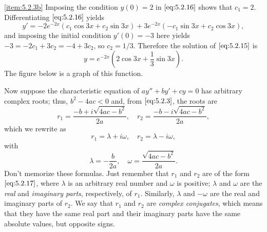 \documentclass{ximera}
\begin{document}
\begin{example}
\begin{explanation}
\ref{item:5.2.3b}   Imposing the condition $y(0)=2$
in $\eqref{eq:5.2.16}$ shows that $c_1=2$.  Differentiating
$\eqref{eq:5.2.16}$ yields
$$
y'=-2e^{-2x}(c_1\cos 3x+c_2\sin 3x) +3e^{-2x}(-c_1\sin 3x +c_2\cos 3x),
$$
and imposing the initial condition $y'(0)=-3$ here yields
$-3=-2c_1+3c_2=-4+3c_2$,
 so $c_2=1/3$. Therefore the solution of
$\eqref{eq:5.2.15}$ is
$$
y=e^{-2x}(2\cos 3x+ \frac{1}{3}\sin 3x).
$$
The figure below is a graph of this function.

\begin{center}
\end{center}
 
\end{explanation}
\end{example}
 
 
Now suppose   the characteristic equation of $ay''+by'+cy=0$ has
arbitrary complex roots;   thus, $b^2-4ac<0$ and, from $\eqref{eq:5.2.3}$,
the
roots are
$$
r_1 = \frac{-b+i\sqrt{4ac-b^2}}{2a},\quad r_2 =
\frac{-b-i\sqrt{4ac-b^2}}{2a},
$$
which we rewrite as
\begin{equation} \label{eq:5.2.17}
r_1=\lambda+i \omega,\quad r_2 = \lambda - i \omega,
\end{equation}
 with
$$
\lambda = -\frac{b}{2a},\quad \omega = \frac{\sqrt{4ac-b^2}}{2a}.
$$
Don't memorize these formulas. Just remember that $r_1$
and $r_2$ are of the form $\eqref{eq:5.2.17}$,
where  $\lambda$ is an arbitrary real number and $\omega$
is   positive;
 $\lambda$ and $\omega$ are  the \textit{real}
and \textit{imaginary parts}, respectively, of $r_1$.
Similarly, $\lambda$ and $-\omega$ are the real and imaginary parts of
$r_2$. We say that $r_1$ and $r_2$ are \textit{complex conjugates},
which means that they have the same real part and their imaginary
parts have the same absolute values, but opposite signs.
 
\end{document}
